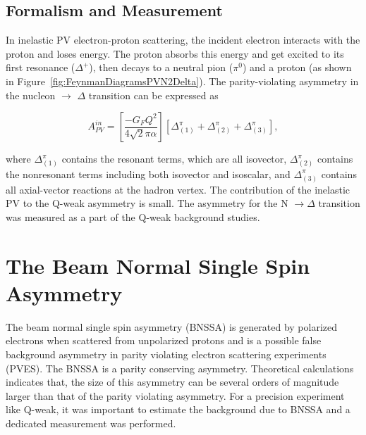 \subsection{Formalism and Measurement}%
\label{Formalism and Measurement}

In inelastic PV electron-proton scattering, the incident electron interacts with the proton and loses energy. The proton absorbs this energy and get excited to its first resonance ($\Delta^{+}$), then decays to a neutral pion ($\pi^{0}$) and a proton (as shown in Figure~\ref{fig:FeynmanDiagramsPVN2Delta}).
The parity-violating asymmetry in the nucleon $\rightarrow$ $\Delta$ transition can be expressed as~\cite{Mukhopadhyay1998481,PhysRevD.65.033001}

\begin{equation} \label{equ:qweak16}
A_{PV}^{in} = \left[ \frac{-G_{F}Q^{2}}{4 \sqrt{2}\pi\alpha} \right] \left[ \Delta_{(1)}^{\pi} + \Delta_{(2)}^{\pi} + \Delta_{(3)}^{\pi} \right],
\end{equation}

\noindent
where $\Delta_{(1)}^{\pi}$ contains the resonant terms, which are all isovector, $\Delta_{(2)}^{\pi}$ contains the nonresonant terms including both isovector and isoscalar, and $\Delta_{(3)}^{\pi}$ contains all axial-vector reactions at the hadron vertex.
The contribution of the inelastic PV to the Q-weak asymmetry is small.
The asymmetry for the N $\rightarrow \Delta$ transition was measured as a part of the Q-weak background studies. 


\section{The Beam Normal Single Spin Asymmetry}%
\label{The Beam Normal Single Spin Asymmetry}

The beam normal single spin asymmetry (BNSSA) is generated by polarized electrons when scattered from unpolarized protons and is a possible false background asymmetry in parity violating electron scattering experiments (PVES). 
The BNSSA is a  parity conserving asymmetry. Theoretical calculations~\cite{Arrington2011782} indicates that, the size of this asymmetry can be several orders of magnitude larger than that of the parity violating asymmetry.
For a precision experiment like Q-weak, it was important to estimate the background due to BNSSA and a dedicated measurement was performed. 

